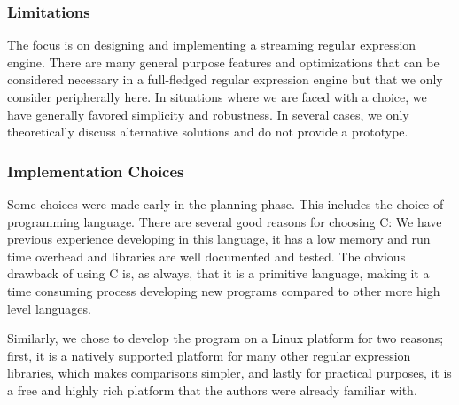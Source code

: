 \subsubsection{Limitations}

The focus is on designing and implementing a streaming regular
expression engine. There are many general purpose features and
optimizations that can be considered necessary in a full-fledged
regular expression engine but that we only consider peripherally
here. In situations where we are faced with a choice, we have
generally favored simplicity and robustness.  In several cases, we
only theoretically discuss alternative solutions and do not provide a
prototype.%

\subsubsection{Implementation Choices}
Some choices were made early in the planning phase. This includes the
choice of programming language. There are several good reasons for
choosing C: We have previous experience developing in this language,
it has a low memory and run time overhead and libraries are well
documented and tested. The obvious drawback of using C is, as always,
that it is a primitive language, making it a time consuming process
developing new programs compared to other more high level languages.

Similarly, we chose to develop the program on a Linux platform for two
reasons; first, it is a natively supported platform for many other regular
expression libraries, which makes comparisons simpler, and lastly for
practical purposes, it is a free and highly rich platform that the
authors were already familiar with.



